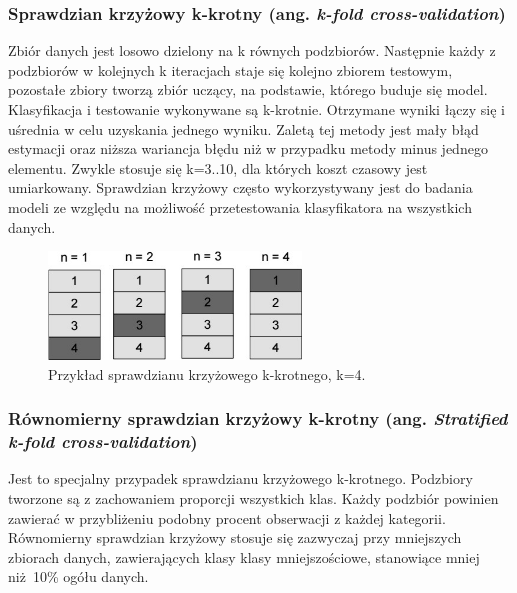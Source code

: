 \subsubsection{Sprawdzian krzyżowy k-krotny (ang. \textit{k-fold cross-validation})}
Zbiór danych jest losowo dzielony na k równych podzbiorów. Następnie każdy z podzbiorów w kolejnych k iteracjach staje się kolejno zbiorem testowym, pozostałe zbiory tworzą zbiór uczący, na podstawie, którego buduje się model. Klasyfikacja i testowanie wykonywane są k-krotnie. Otrzymane wyniki łączy się i uśrednia w celu uzyskania jednego wyniku. Zaletą tej metody jest mały błąd estymacji oraz niższa wariancja błędu niż w przypadku metody minus jednego elementu. Zwykle stosuje się k=3..10, dla których koszt czasowy jest umiarkowany. Sprawdzian krzyżowy często wykorzystywany jest do badania modeli ze względu na możliwość przetestowania klasyfikatora na wszystkich danych.
\begin{figure}[h]
	\centering
	\includegraphics[width=0.6\textwidth]{./images/crossvalidation.jpg}
	\caption{Przykład sprawdzianu krzyżowego k-krotnego, k=4.}
	\label{fig:sprawdziankrzyzowy}
\end{figure}

\subsubsection{Równomierny sprawdzian krzyżowy k-krotny (ang. \textit{Stratified k-fold cross-validation})}
Jest to specjalny przypadek sprawdzianu krzyżowego k-krotnego. Podzbiory tworzone są z zachowaniem proporcji wszystkich klas. Każdy podzbiór powinien zawierać w przybliżeniu podobny procent obserwacji z każdej kategorii. Równomierny sprawdzian krzyżowy stosuje się zazwyczaj przy mniejszych zbiorach danych, zawierających klasy klasy mniejszościowe, stanowiące mniej niż 10\% ogółu danych.









